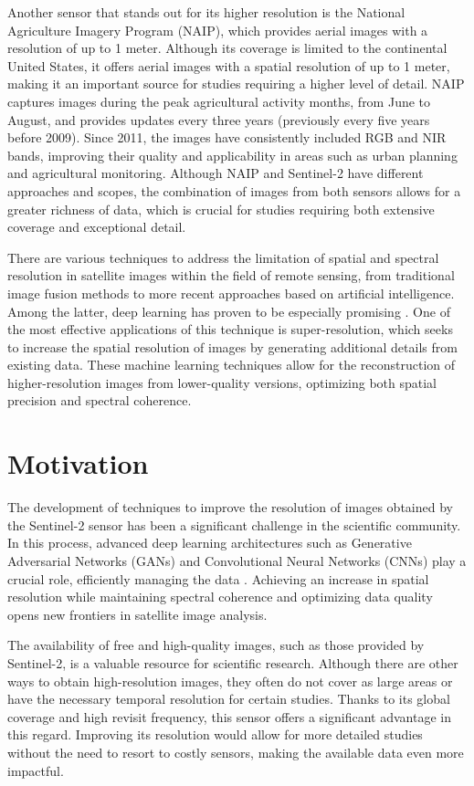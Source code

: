 Another sensor that stands out for its higher resolution is the National Agriculture Imagery Program (NAIP), which provides aerial images with a resolution of up to 1 meter. Although its coverage is limited to the continental United States, it offers aerial images with a spatial resolution of up to 1 meter, making it an important source for studies requiring a higher level of detail. NAIP captures images during the peak agricultural activity months, from June to August, and provides updates every three years (previously every five years before 2009). Since 2011, the images have consistently included RGB and NIR bands, improving their quality and applicability in areas such as urban planning and agricultural monitoring. Although NAIP and Sentinel-2 have different approaches and scopes, the combination of images from both sensors allows for a greater richness of data, which is crucial for studies requiring both extensive coverage and exceptional detail.

There are various techniques to address the limitation of spatial and spectral resolution in satellite images within the field of remote sensing, from traditional image fusion methods to more recent approaches based on artificial intelligence. Among the latter, deep learning has proven to be especially promising \autocite{gargiulo2019fast}. One of the most effective applications of this technique is super-resolution, which seeks to increase the spatial resolution of images by generating additional details from existing data. These machine learning techniques allow for the reconstruction of higher-resolution images from lower-quality versions, optimizing both spatial precision and spectral coherence.

\section{Motivation}

The development of techniques to improve the resolution of images obtained by the Sentinel-2 sensor has been a significant challenge in the scientific community. In this process, advanced deep learning architectures such as Generative Adversarial Networks (GANs) and Convolutional Neural Networks (CNNs) play a crucial role, efficiently managing the data \autocite{salgueiro2020super}. Achieving an increase in spatial resolution while maintaining spectral coherence and optimizing data quality opens new frontiers in satellite image analysis.

The availability of free and high-quality images, such as those provided by Sentinel-2, is a valuable resource for scientific research. Although there are other ways to obtain high-resolution images, they often do not cover as large areas or have the necessary temporal resolution for certain studies. Thanks to its global coverage and high revisit frequency, this sensor offers a significant advantage in this regard. Improving its resolution would allow for more detailed studies without the need to resort to costly sensors, making the available data even more impactful.

